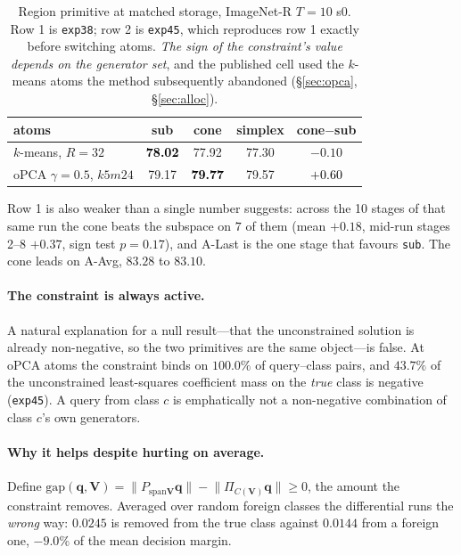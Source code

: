 \documentclass[10pt,twocolumn]{article}
\newcommand{\bq}{\mathbf{q}}
\newcommand{\bV}{\mathbf{V}}
\newcommand{\good}[1]{\textcolor{black}{\textbf{#1}}}
\begin{document}
\begin{table}[t]\centering\small
\begin{tabular}{lcccc}
\toprule
atoms & sub & cone & simplex & cone$-$sub \\
\midrule
$k$-means, $R{=}32$      & \good{78.02} & 77.92 & 77.30 & $-0.10$ \\
oPCA $\gamma{=}0.5$, $k5m24$ & 79.17 & \good{79.77} & 79.57 & \good{$+0.60$} \\
\bottomrule
\end{tabular}
\caption{Region primitive at matched storage, ImageNet-R $T{=}10$ s0. Row 1 is
\texttt{exp38}; row 2 is \texttt{exp45}, which reproduces row 1 exactly before
switching atoms. \emph{The sign of the constraint's value depends on the
generator set}, and the published cell used the $k$-means atoms the method
subsequently abandoned (\S\ref{sec:opca}, \S\ref{sec:alloc}).}
\label{tab:constraint}
\end{table}

Row 1 is also weaker than a single number suggests: across the 10 stages of that
same run the cone beats the subspace on $7$ of them (mean $+0.18$, mid-run
stages 2--8 $+0.37$, sign test $p{=}0.17$), and A-Last is the one stage that
favours \texttt{sub}. The cone leads on A-Avg, $83.28$ to $83.10$.

\paragraph{The constraint is always active.} A natural explanation for a null
result---that the unconstrained solution is already non-negative, so the two
primitives are the same object---is false. At oPCA atoms the constraint binds on
$100.0\%$ of query--class pairs, and $43.7\%$ of the unconstrained
least-squares coefficient mass on the \emph{true} class is negative
(\texttt{exp45}). A query from class $c$ is emphatically not a non-negative
combination of class $c$'s own generators.

\paragraph{Why it helps despite hurting on average.} Define
$\mathrm{gap}(\bq,\bV)=\lVert P_{\mathrm{span}\bV}\bq\rVert-\lVert\Pi_{C(\bV)}\bq\rVert\ge0$,
the amount the constraint removes. Averaged over random foreign classes the
differential runs the \emph{wrong} way: $0.0245$ is removed from the true class
against $0.0144$ from a foreign one, $-9.0\%$ of the mean decision margin.
\end{document}
